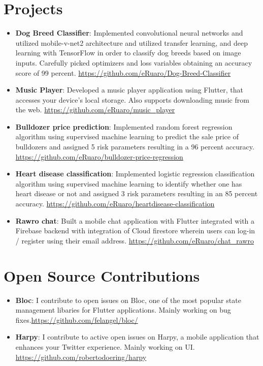 \documentclass[letterpaper,11pt]{article}
\newcommand{\resumeItem}[2]{
  \item\small{
    \textbf{#1}{: #2 \vspace{-2pt}}
  }
}
\newcommand{\resumeSubItem}[2]{\resumeItem{#1}{#2}\vspace{-4pt}}
\newcommand{\resumeSubHeadingListStart}{\begin{itemize}[leftmargin=*]}
\newcommand{\resumeSubHeadingListEnd}{\end{itemize}}
\begin{document}
\section{Projects}
  \resumeSubHeadingListStart
    \resumeSubItem{Dog Breed Classifier}
      {Implemented convolutional neural networks and
utilized mobile-v-net2 architecture and utilized transfer learning, and deep learning with TensorFlow in order to classify dog
breeds based on image inputs. Carefully picked optimizers and loss variables obtaining an accuracy score of 99 percent. \href{https://github.com/eRuaro/Dog-Breed-Classifier}{https://github.com/eRuaro/Dog-Breed-Classifier}} 
\vspace{0.5mm}

    \resumeSubItem{Music Player}
      {Developed a music player application using Flutter, that accesses your device's local storage. Also supports downloading music from the web. \href{https://github.com/eRuaro/music_player}{https://github.com/eRuaro/music_player}}
      \vspace{0.5mm}
      
    \resumeSubItem{Bulldozer price prediction}
      {Implemented random forest regression
algorithm using supervised machine learning to predict the sale price of bulldozers and assigned 5 risk parameters resulting in a
96 percent accuracy. \href{https://github.com/eRuaro/bulldozer-price-regression}{https://github.com/eRuaro/bulldozer-price-regression}}
\vspace{0.5mm}
\resumeSubItem{Heart disease classification}
{Implemented logistic regression
classification algorithm using supervised machine learning to identify whether one has heart disease or not and assigned 3 risk
parameters resulting in an 85 percent accuracy. \href{ https://github.com/eRuaro/heartdisease-classification}{ https://github.com/eRuaro/heartdisease-classification}}
\vspace{0.5mm}
\resumeSubItem{Rawro chat} 
{Built a mobile chat application with Flutter integrated with a Firebase backend
with integration of Cloud firestore wherein users can log-in / register using their email address. \href{https://github.com/eRuaro/chat_rawro}{https://github.com/eRuaro/chat_rawro}}

  \resumeSubHeadingListEnd
  
%
 \section{Open Source Contributions}
 \resumeSubHeadingListStart
 \resumeSubItem{Bloc} {I contribute to open issues on Bloc, one of the most popular state management libaries for Flutter applications. Mainly working on bug fixes.\href{https://github.com/felangel/bloc/}{https://github.com/felangel/bloc/}}
 \vspace{0.5mm}
 \resumeSubItem{Harpy} { I contribute to active open issues on Harpy, a mobile application that enhances your Twitter
experience. Mainly working on UI. \href{https://github.com/robertodoering/harpy}{https://github.com/robertodoering/harpy}}
\resumeSubHeadingListEnd
\end{document}
